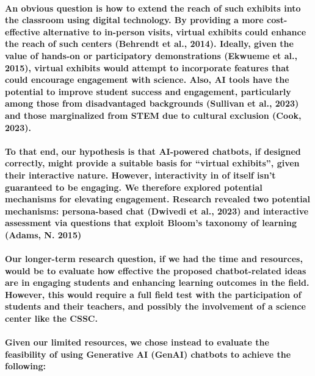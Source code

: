 \documentclass{article}
\begin{document}
\newpage

\paragraph{An obvious question is how to extend the reach of such exhibits into the classroom using digital technology. By providing a more cost-effective alternative to in-person visits, virtual exhibits could enhance the reach of such centers (Behrendt et al., 2014). Ideally, given the value of hands-on or participatory demonstrations (Ekwueme et al., 2015), virtual exhibits would attempt to incorporate features that could encourage engagement with science. Also, AI tools have the potential to improve student success and engagement, particularly among those from disadvantaged backgrounds (Sullivan et al., 2023) and those marginalized from STEM due to cultural exclusion (Cook, 2023).}

\paragraph{To that end, our hypothesis is that AI-powered chatbots, if designed correctly, might provide a suitable basis for “virtual exhibits”, given their interactive nature. However, interactivity in of itself isn’t guaranteed to be engaging. We therefore explored potential mechanisms for elevating engagement. Research revealed two potential mechanisms: persona-based chat (Dwivedi et al., 2023) and interactive assessment via questions that exploit Bloom’s taxonomy of learning (Adams, N. 2015)}

\paragraph{Our longer-term research question, if we had the time and resources, would be to evaluate how effective the proposed chatbot-related ideas are in engaging students and enhancing learning outcomes in the field. However, this would require a full field test with the participation of students and their teachers, and possibly the involvement of a science center like the CSSC. }

\paragraph{Given our limited resources, we chose instead to evaluate the feasibility of using Generative AI (GenAI) chatbots to achieve the following:}
\end{document}
